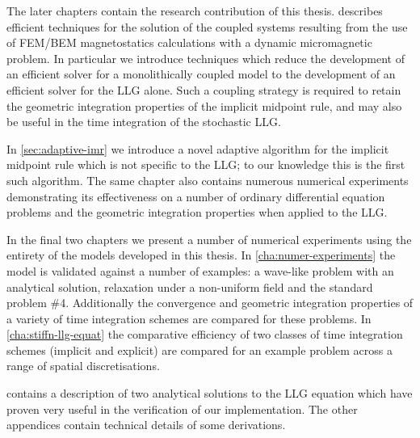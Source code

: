 The later chapters contain the research contribution of this thesis.
 describes efficient techniques for the solution of the coupled systems resulting from the use of FEM/BEM magnetostatics calculations with a dynamic micromagnetic problem.
In particular we introduce techniques which reduce the development of an efficient solver for a monolithically coupled model to the development of an efficient solver for the LLG alone.
Such a coupling strategy is required to retain the geometric integration properties of the implicit midpoint rule, and may also be useful in the time integration of the stochastic LLG.

In \cref{sec:adaptive-imr} we introduce a novel adaptive algorithm for the implicit midpoint rule which is not specific to the LLG; to our knowledge this is the first such algorithm.
The same chapter also contains numerous numerical experiments demonstrating its effectiveness on a number of ordinary differential equation problems and the geometric integration properties when applied to the LLG.

In the final two chapters we present a number of numerical experiments using the entirety of the models developed in this thesis.
In \cref{cha:numer-experiments} the model is validated against a number of examples: a wave-like problem with an analytical solution, relaxation under a non-uniform field and the \mumag standard problem \#4.
Additionally the convergence and geometric integration properties of a variety of time integration schemes are compared for these problems.
In \cref{cha:stiffn-llg-equat} the comparative efficiency of two classes of time integration schemes (implicit and explicit) are compared for an example problem across a range of spatial discretisations.

 contains a description of two analytical solutions to the LLG equation which have proven very useful in the verification of our implementation.
The other appendices contain technical details of some derivations.


